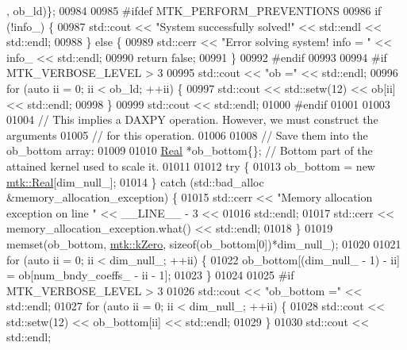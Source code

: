 \begin{DoxyCode}
{{      , ob\_ld)\};
00984 
00985 \textcolor{preprocessor}{    #ifdef MTK\_PERFORM\_PREVENTIONS}
00986     \textcolor{keywordflow}{if} (!info\_) \{
00987       std::cout << \textcolor{stringliteral}{"System successfully solved!"} << std::endl << std::endl;
00988     \} \textcolor{keywordflow}{else} \{
00989       std::cerr << \textcolor{stringliteral}{"Error solving system! info = "} << info\_ << std::endl;
00990       \textcolor{keywordflow}{return} \textcolor{keyword}{false};
00991     \}
00992 \textcolor{preprocessor}{    #endif}
00993 
00994 \textcolor{preprocessor}{    #if MTK\_VERBOSE\_LEVEL > 3}
00995     std::cout << \textcolor{stringliteral}{"ob ="} << std::endl;
00996     \textcolor{keywordflow}{for} (\textcolor{keyword}{auto} ii = 0; ii < ob\_ld; ++ii) \{
00997       std::cout << std::setw(12) << ob[ii] << std::endl;
00998     \}
00999     std::cout << std::endl;
01000 \textcolor{preprocessor}{    #endif}
01001 
01003 
01004     \textcolor{comment}{// This implies a DAXPY operation. However, we must construct the arguments}
01005     \textcolor{comment}{// for this operation.}
01006 
01008     \textcolor{comment}{// Save them into the ob\_bottom array:}
01009 
01010     \hyperlink{group__c01-roots_gac080bbbf5cbb5502c9f00405f894857d}{Real} *ob\_bottom\{\}; \textcolor{comment}{// Bottom part of the attained kernel used to scale it.}
01011 
01012     \textcolor{keywordflow}{try} \{
01013       ob\_bottom = \textcolor{keyword}{new} \hyperlink{group__c01-roots_gac080bbbf5cbb5502c9f00405f894857d}{mtk::Real}[dim\_null\_];
01014     \} \textcolor{keywordflow}{catch} (std::bad\_alloc &memory\_allocation\_exception) \{
01015       std::cerr << \textcolor{stringliteral}{"Memory allocation exception on line "} << \_\_LINE\_\_ - 3 <<
01016         std::endl;
01017       std::cerr << memory\_allocation\_exception.what() << std::endl;
01018     \}
01019     memset(ob\_bottom, \hyperlink{group__c01-roots_ga59a451a5fae30d59649bcda274fea271}{mtk::kZero}, \textcolor{keyword}{sizeof}(ob\_bottom[0])*dim\_null\_);
01020 
01021     \textcolor{keywordflow}{for} (\textcolor{keyword}{auto} ii = 0; ii < dim\_null\_; ++ii) \{
01022       ob\_bottom[(dim\_null\_ - 1) - ii] = ob[num\_bndy\_coeffs\_ - ii - 1];
01023     \}
01024 
01025 \textcolor{preprocessor}{    #if MTK\_VERBOSE\_LEVEL > 3}
01026     std::cout << \textcolor{stringliteral}{"ob\_bottom ="} << std::endl;
01027     \textcolor{keywordflow}{for} (\textcolor{keyword}{auto} ii = 0; ii < dim\_null\_; ++ii) \{
01028       std::cout << std::setw(12) << ob\_bottom[ii] << std::endl;
01029     \}
01030     std::cout << std::endl;
}}
\end{DoxyCode}
